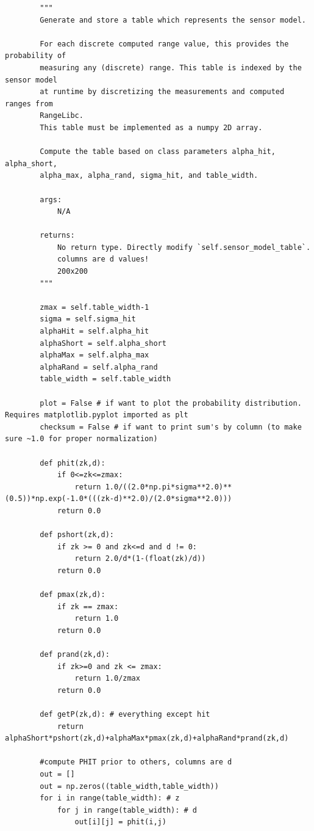 \documentclass{article}
\begin{document}
{\begin{verbatim}
        """
        Generate and store a table which represents the sensor model.
        
        For each discrete computed range value, this provides the probability of 
        measuring any (discrete) range. This table is indexed by the sensor model
        at runtime by discretizing the measurements and computed ranges from
        RangeLibc.
        This table must be implemented as a numpy 2D array.

        Compute the table based on class parameters alpha_hit, alpha_short,
        alpha_max, alpha_rand, sigma_hit, and table_width.

        args:
            N/A
        
        returns:
            No return type. Directly modify `self.sensor_model_table`.
            columns are d values!
            200x200
        """

        zmax = self.table_width-1
        sigma = self.sigma_hit 
        alphaHit = self.alpha_hit
        alphaShort = self.alpha_short
        alphaMax = self.alpha_max
        alphaRand = self.alpha_rand
        table_width = self.table_width

        plot = False # if want to plot the probability distribution. Requires matplotlib.pyplot imported as plt
        checksum = False # if want to print sum's by column (to make sure ~1.0 for proper normalization)

        def phit(zk,d):
            if 0<=zk<=zmax:
                return 1.0/((2.0*np.pi*sigma**2.0)**(0.5))*np.exp(-1.0*(((zk-d)**2.0)/(2.0*sigma**2.0)))
            return 0.0

        def pshort(zk,d):
            if zk >= 0 and zk<=d and d != 0:
                return 2.0/d*(1-(float(zk)/d))
            return 0.0

        def pmax(zk,d): 
            if zk == zmax:
                return 1.0
            return 0.0

        def prand(zk,d):
            if zk>=0 and zk <= zmax:
                return 1.0/zmax
            return 0.0

        def getP(zk,d): # everything except hit
            return alphaShort*pshort(zk,d)+alphaMax*pmax(zk,d)+alphaRand*prand(zk,d)
                
        #compute PHIT prior to others, columns are d
        out = []
        out = np.zeros((table_width,table_width))
        for i in range(table_width): # z
            for j in range(table_width): # d
                out[i][j] = phit(i,j)


\end{verbatim}}
\end{document}

